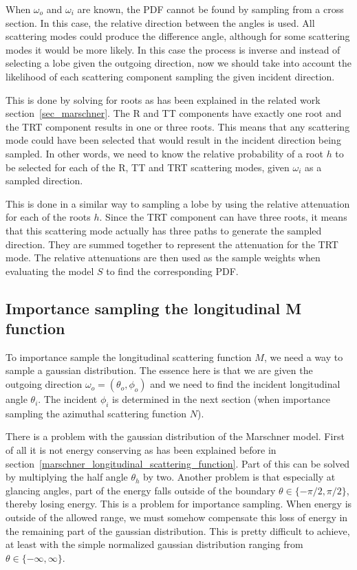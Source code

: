 \documentclass[11pt,a4paper]{report}
\begin{document}
When $\omega_o$ and $\omega_i$ are known, the PDF cannot be found by sampling from a cross section. In this case, the relative direction between the angles is used. All scattering modes could produce the difference angle, although for some scattering modes it would be more likely. In this case the process is inverse and instead of selecting a lobe given the outgoing direction, now we should take into account the likelihood of each scattering component sampling the given incident direction.

This is done by solving for roots as has been explained in the related work section~\ref{sec_marschner}. The R and TT components have exactly one root and the TRT component results in one or three roots. This means that any scattering mode could have been selected that would result in the incident direction being sampled. In other words, we need to know the relative probability of a root $h$ to be selected for each of the R, TT and TRT scattering modes, given $\omega_i$ as a sampled direction.

This is done in a similar way to sampling a lobe by using the relative attenuation for each of the roots $h$. Since the TRT component can have three roots, it means that this scattering mode actually has three paths to generate the sampled direction. They are summed together to represent the attenuation for the TRT mode. The relative attenuations are then used as the sample weights when evaluating the model $S$ to find the corresponding PDF.

\subsection{Importance sampling the longitudinal M function}
\label{sec_importance_sampling_M}

To importance sample the longitudinal scattering function $M$, we need a way to sample a gaussian distribution. The essence here is that we are given the outgoing direction $\omega_o = (\theta_o, \phi_o)$ and we need to find the incident longitudinal angle $\theta_i$. The incident $\phi_i$ is determined in the next section (when importance sampling the azimuthal scattering function $N$).

There is a problem with the gaussian distribution of the Marschner model. First of all it is not energy conserving as has been explained before in section~\ref{marschner_longitudinal_scattering_function}. Part of this can be solved by multiplying the half angle $\theta_h$ by two. Another problem is that especially at glancing angles, part of the energy falls outside of the boundary $\theta \in \{ -\pi/2, \pi/2 \}$, thereby losing energy. This is a problem for importance sampling. When energy is outside of the allowed range, we must somehow compensate this loss of energy in the remaining part of the gaussian distribution. This is pretty difficult to achieve, at least with the simple normalized gaussian distribution ranging from $\theta \in \{ -\infty, \infty \}$.
\end{document}
